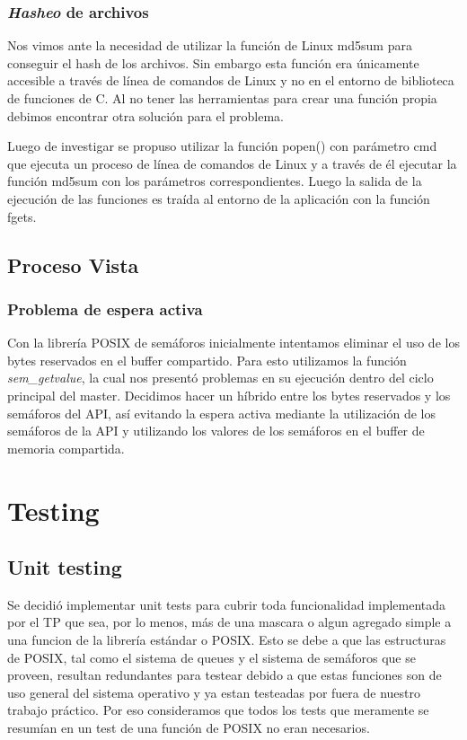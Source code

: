 \documentclass[10pt,a4paper]{report}
\begin{document}
\subsection{\textit{Hasheo} de archivos}
Nos vimos ante la necesidad de utilizar la función de Linux md5sum para conseguir el hash de los archivos. Sin embargo esta función
era únicamente accesible a través de línea de comandos de Linux y no en el entorno de biblioteca de funciones de C. Al no tener las
herramientas para crear una función propia debimos encontrar otra solución para el problema.

Luego de investigar se propuso utilizar la función popen() con parámetro cmd que ejecuta un proceso de línea de comandos
de Linux y a través de él ejecutar la función md5sum con los parámetros correspondientes. Luego la salida de la ejecución de las funciones
es traída al entorno de la aplicación con la función fgets.
\section{Proceso Vista}
\subsection{Problema de espera activa}
	Con la librería POSIX de semáforos inicialmente intentamos eliminar el uso de los bytes reservados en el buffer compartido. Para esto utilizamos la función \textit{sem\_getvalue}, la cual nos presentó problemas en su ejecución dentro del ciclo principal del master. Decidimos hacer un híbrido entre los bytes reservados y los semáforos del API, así evitando la espera activa mediante la utilización de los semáforos de la API y utilizando los valores de los semáforos en el buffer de memoria compartida.


\chapter{Testing}
\section{Unit testing}
Se decidió implementar unit tests para cubrir toda funcionalidad implementada por el TP que sea, por lo menos, más de una mascara o algun agregado simple a una funcion de la librería estándar o POSIX. 
Esto se debe a que las estructuras de POSIX, tal como el sistema de queues y el sistema de semáforos que se proveen, resultan redundantes para testear debido a que estas funciones son de uso general del sistema operativo y ya estan testeadas por fuera de nuestro trabajo práctico. Por eso consideramos que todos los tests que meramente se resumían en un test de una función de POSIX no eran necesarios.
\end{document}
